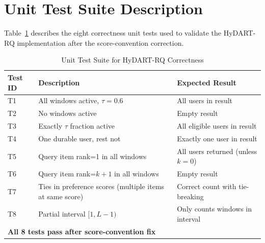 \section{Unit Test Suite Description}

Table~\ref{tab:tests} describes the eight correctness unit tests used to validate the HyDART-RQ implementation after the score-convention correction.

\begin{table}[htbp]
\centering
\caption{Unit Test Suite for HyDART-RQ Correctness}
\label{tab:tests}
\begin{tabular}{lll}
\toprule
\textbf{Test ID} & \textbf{Description} & \textbf{Expected Result} \\
\midrule
T1 & All windows active, $\tau=0.6$ & All users in result \\
T2 & No windows active & Empty result \\
T3 & Exactly $\tau$ fraction active & All eligible users in result \\
T4 & One durable user, rest not & Exactly one user in result \\
T5 & Query item rank=1 in all windows & All users returned (unless $k=0$) \\
T6 & Query item rank=$k+1$ in all windows & Empty result \\
T7 & Ties in preference scores (multiple items at same score) & Correct count with tie-breaking \\
T8 & Partial interval $[1, L-1)$ & Only counts windows in interval \\
\midrule
\multicolumn{2}{l}{\textbf{All 8 tests pass after score-convention fix}} & \\
\bottomrule
\end{tabular}
\end{table}
